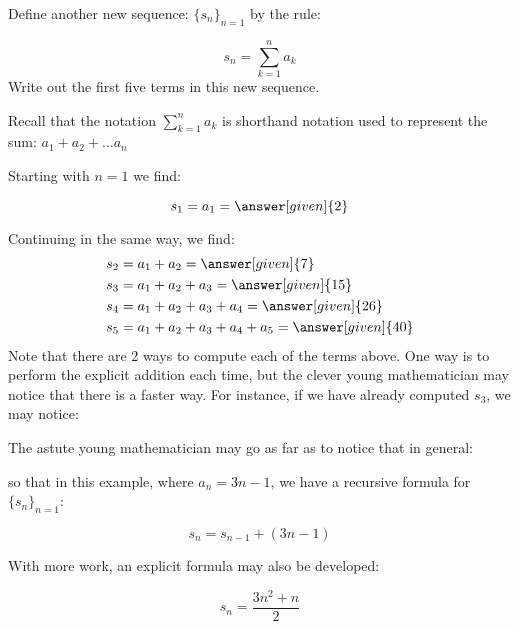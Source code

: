 \documentclass{ximera}
\begin{document}
\begin{example}
\begin{example}
\begin{explanation}
\end{explanation}
\end{example}

\begin{example}
Define another new sequence: $\{s_n\}_{n=1}$ by the rule:

\[
s_n = \sum_{k=1}^n a_k 
\]
Write out the first five terms in this new sequence.

Recall that the notation $\sum_{k=1}^n a_k$ is shorthand notation used to represent the sum: $a_1+a_2+\ldots a_n$



\begin{explanation}
Starting with $n=1$ we find:

\[      s_1 = a_1 = \answer[given]{2}       \]
      
Continuing in the same way, we find:     
     \begin{align*}
      	s_2 &=  a_1 +a_2 = \answer[given]{7}  \\ 
	s_3 &=  a_1 +a_2 + a_3 = \answer[given]{15}   \\ 
	s_4 &=  a_1 +a_2 +a_3 +a_4= \answer[given]{26}  \\ 
	s_5 &=  a_1 +a_2 +a_3+a_4+a_5= \answer[given]{40}    
    \end{align*}
Note that there are 2 ways to compute each of the terms above.  One way is to perform the explicit addition each time, but the clever young mathematician may notice that there is a faster way.  For instance, if we have already computed $s_3$, we may notice:

\begin{image}
  \end{image}

The astute young mathematician may go as far as to notice that in general:

\begin{image}
  \end{image}
so that in this example, where $a_n = 3n-1$, we have a recursive formula for $\{s_n\}_{n=1}$:

\[
s_n = s_{n-1} + (3n-1)
\]  

With more work, an explicit formula may also be developed:

\[
s_n = \frac{3n^2+n}{2}
\]
    
\end{explanation}
\end{example}   
\end{example}
\end{document}
